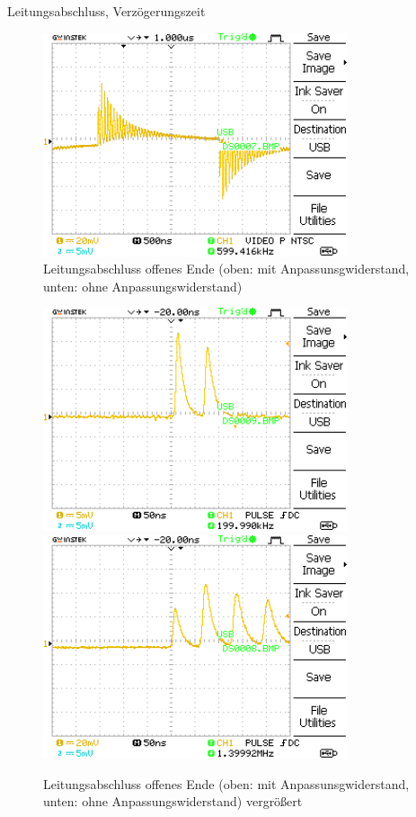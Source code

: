 \documentclass[ngerman]{scrartcl}
\theoremstyle{definition}
\begin{document}
\begin{aufgabe}{Leitungsabschluss, Verzögerungszeit}
\begin{unteraufgabe}
\begin{figure}[H]
					\includegraphics[width=0.8\textwidth]{MesswerteVersuch1/DS0007.png}
					\caption{Leitungsabschluss offenes Ende (oben: mit Anpassunsgwiderstand, unten: ohne Anpassungswiderstand)}
					\label{fig:DS0006,7}
				\end{figure}
			\end{unteraufgabe}
\clearpage
			\begin{unteraufgabe}
				\begin{figure}[H]
					\centering
					\includegraphics[width=0.8\textwidth]{MesswerteVersuch1/DS0009.png}
					\includegraphics[width=0.8\textwidth]{MesswerteVersuch1/DS0008.png}
					\caption{Leitungsabschluss offenes Ende (oben: mit Anpassunsgwiderstand, unten: ohne Anpassungswiderstand) vergrößert}
					\label{fig:DS0009.8}
				\end{figure}
			\end{unteraufgabe}


\end{aufgabe}
\end{document}
